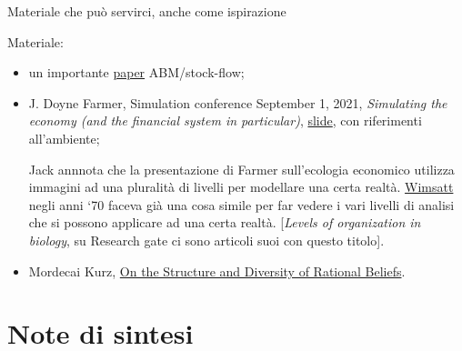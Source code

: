 \documentclass[9pt]{beamer}
\begin{document}
\begin{frame}{Materiale che pu\`{o} servirci, anche come ispirazione}

Materiale:

\begin{itemize}

\item
un importante \href{https://terna.to.it/ejmmp/deposito/stockFlow.pdf}{paper} ABM/stock-flow;

\item
J. Doyne Farmer, Simulation conference September 1, 2021, \emph{Simulating the economy
(and the financial system in particular)}, \href{https://www.suomenpankki.fi/globalassets/en/financial-stability/payment-and-settelement-system-simulator/events/2021_01_farmer.pdf}{slide}, con riferimenti all'ambiente;

Jack annnota che la presentazione di Farmer sull'ecologia economico utilizza immagini ad una pluralit\`{a} di livelli per modellare una certa realt\`{a}. 
\href{https://en.wikipedia.org/wiki/William_C._Wimsatt}{Wimsatt} negli anni `70 faceva gi\`{a} una cosa simile per far vedere i vari livelli di analisi che si possono applicare ad una certa realt\`{a}. [\emph{Levels of organization in biology}, su Research gate ci sono articoli suoi con questo titolo].

\item 
Mordecai Kurz, \href{http://sfi-edu.s3.amazonaws.com/sfi-edu/production/uploads/sfi-com/dev/uploads/filer/9f/28/9f288132-c3b3-410a-8ff7-2b8303014790/91-02-013.pdf}{On the Structure and Diversity of Rational Beliefs}.



\end{itemize}

\end{frame}


\section{Note di sintesi}
\end{document}
